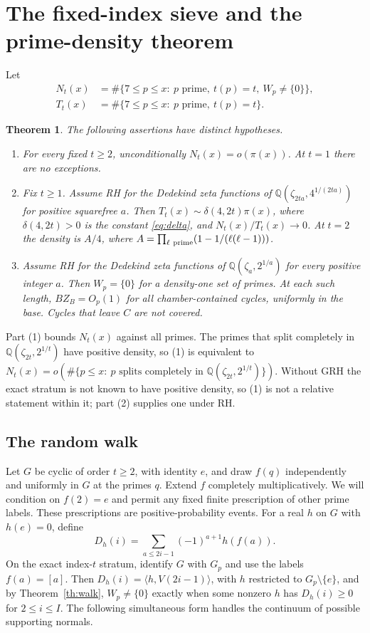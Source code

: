 \documentclass[11pt,reqno]{amsart}
\newtheorem{theorem}{Theorem}
\newcommand{\Q}{\mathbb Q}
\begin{document}
\section{The fixed-index sieve and the prime-density theorem}\label{sec:sieve}
Let
\[
\begin{aligned}
 N_t(x)&=\#\{7\le p\le x:\ p\text{ prime},\ t(p)=t,\ W_p\ne\{0\}\},\\
 T_t(x)&=\#\{7\le p\le x:\ p\text{ prime},\ t(p)=t\}.
\end{aligned}
\]

\begin{theorem}\label{th:sieve}
The following assertions have distinct hypotheses.
\begin{enumerate}
\item For every fixed \(t\ge2\), unconditionally \(N_t(x)=o(\pi(x))\). At \(t=1\) there are no exceptions.
\item Fix \(t\ge1\). Assume RH for the Dedekind zeta functions of
\(\Q(\zeta_{2ta},4^{1/(2ta)})\) for positive squarefree \(a\). Then
\(T_t(x)\sim\delta(4,2t)\pi(x)\), where \(\delta(4,2t)>0\) is the constant \eqref{eq:delta}, and \(N_t(x)/T_t(x)\to0\). At \(t=2\) the density is \(A/4\), where \(A=\prod_{\ell\ {\rm prime}}(1-1/(\ell(\ell-1)))\).
\item Assume RH for the Dedekind zeta functions of \(\Q(\zeta_a,2^{1/a})\) for every positive integer \(a\). Then \(W_p=\{0\}\) for a density-one set of primes. At each such length, \(BZ_B=O_p(1)\) for all chamber-contained cycles, uniformly in the base. Cycles that leave \(C\) are not covered.
\end{enumerate}
\end{theorem}

Part (1) bounds \(N_t(x)\) against all primes. The primes that split completely in \(\Q(\zeta_{2t},2^{1/t})\) have positive density, so (1) is equivalent to \(N_t(x)=o(\#\{p\le x:\ p\text{ splits completely in }\Q(\zeta_{2t},2^{1/t})\})\). Without GRH the exact stratum is not known to have positive density, so (1) is not a relative statement within it; part (2) supplies one under RH.

\subsection*{The random walk}
Let \(G\) be cyclic of order \(t\ge2\), with identity \(e\), and draw \(f(q)\) independently and uniformly in \(G\) at the primes \(q\). Extend \(f\) completely multiplicatively. We will condition on \(f(2)=e\) and permit any fixed finite prescription of other prime labels. These prescriptions are positive-probability events. For a real \(h\) on \(G\) with \(h(e)=0\), define
\[
 D_h(i)=\sum_{a\le 2i-1}(-1)^{a+1}h(f(a)).
\]
On the exact index-\(t\) stratum, identify \(G\) with \(G_p\) and use the labels \(f(a)=[a]\). Then \(D_h(i)=\langle h,V(2i-1)\rangle\), with \(h\) restricted to \(G_p\setminus\{e\}\), and by Theorem~\ref{th:walk}, \(W_p\ne\{0\}\) exactly when some nonzero \(h\) has \(D_h(i)\ge0\) for \(2\le i\le I\). The following simultaneous form handles the continuum of possible supporting normals.
\end{document}
